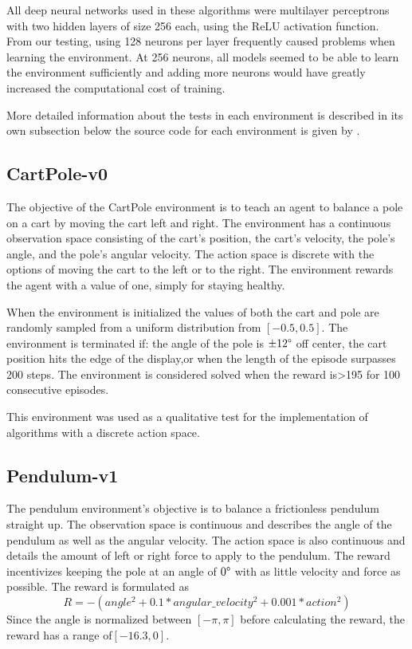 \documentclass[conference]{IEEEtran}
\begin{document}
All deep neural networks used in these algorithms were multilayer perceptrons with two hidden layers of size 256 each, using the ReLU activation function. From our testing, using 128 neurons per layer frequently caused problems when learning the environment. At 256 neurons, all models seemed to be able to learn the environment sufficiently and adding more neurons would have greatly increased the computational cost of training.

More detailed information about the tests in each environment is described in its own subsection below the source code for each environment is given by \cite {gym_source}.

\subsection{CartPole-v0}

The objective of the CartPole environment is to teach an agent to balance a pole on a cart by moving the cart left and right. The environment has a continuous observation space consisting of the cart's position, the cart's velocity, the pole's angle, and the pole's angular velocity. The action space is discrete with the options of moving the cart to the left or to the right. The environment rewards the agent with a value of one, simply for staying healthy.

When the environment is initialized the values of both the cart and pole are randomly sampled from a uniform distribution from $[-0.5, 0.5]$. The environment is terminated if: the angle of the pole is $\pm12\degree$ off center, the cart position hits the edge of the display,or when the length of the episode surpasses 200 steps. The environment is considered solved when the reward is\textgreater 195 for 100 consecutive episodes.

This environment was used as a qualitative test for the implementation of algorithms with a discrete action space.

\subsection{Pendulum-v1}

The pendulum environment's objective is to balance a frictionless pendulum straight up. The observation space is continuous and describes the angle of the pendulum as well as the angular velocity. The action space is also continuous and details the amount of left or right force to apply to the pendulum. The reward incentivizes keeping the pole at an angle of $0\degree$ with as little velocity and force as possible. The reward is formulated as
$$
    R = -(angle ^{2} + 0.1 * angular\_velocity ^ {2} + 0.001 * action ^ {2})
$$
Since the angle is normalized between $[-\pi, \pi]$ before calculating the reward, the reward has a range of$[-16.3, 0]$.
\end{document}
